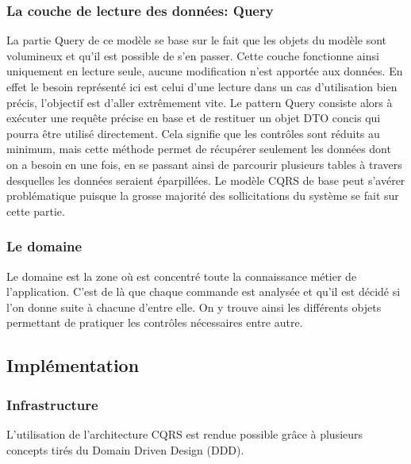 \subsubsection{La couche de lecture des données: Query}
\label{subs:La couche de lecture des données: Query}
La partie Query de ce modèle se base sur le fait que les objets du modèle sont volumineux et qu'il est possible de s'en passer.
Cette couche fonctionne ainsi uniquement en lecture seule, aucune modification n'est apportée aux données.
En effet le besoin représenté ici est celui d'une lecture dans un cas d'utilisation bien précis, l'objectif est d'aller extrêmement vite.
Le pattern Query consiste alors à exécuter une requête précise en base et de restituer un objet DTO concis qui pourra être utilisé directement.
Cela signifie que les contrôles sont réduits au minimum, mais cette méthode permet de récupérer seulement les données dont on a besoin en une fois, en se passant ainsi de parcourir plusieurs tables à travers desquelles les données seraient éparpillées.
Le modèle CQRS de base peut s'avérer problématique puisque la grosse majorité des sollicitations du système se fait sur cette partie.
\subsubsection{Le domaine}
\label{subs:Le domaine}
Le domaine est la zone où est concentré toute la connaissance métier de l'application.
C'est de là que chaque commande est analysée et qu'il est décidé si l'on donne suite à chacune d'entre elle.
On y trouve ainsi les différents objets permettant de pratiquer les contrôles nécessaires entre autre.

\subsection{Implémentation}
\label{sub:Implémentation}
\subsubsection{Infrastructure}
\label{subs:Infrastructure}
L'utilisation de l'architecture CQRS est rendue possible grâce à plusieurs concepts tirés du Domain Driven Design (DDD).
